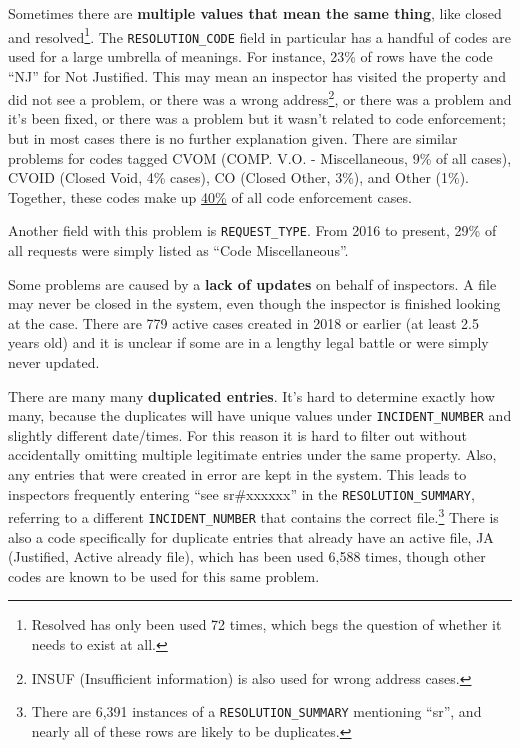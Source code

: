 \documentclass[
]{book}
\begin{document}
Sometimes there are \textbf{multiple values that mean the same thing}, like closed and resolved\footnote{Resolved has only been used 72 times, which begs the question of whether it needs to exist at all.}. The \texttt{RESOLUTION\_CODE} field in particular has a handful of codes are used for a large umbrella of meanings. For instance, 23\% of rows have the code ``NJ'' for Not Justified. This may mean an inspector has visited the property and did not see a problem, or there was a wrong address\footnote{INSUF (Insufficient information) is also used for wrong address cases.}, or there was a problem and it's been fixed, or there was a problem but it wasn't related to code enforcement; but in most cases there is no further explanation given. There are similar problems for codes tagged CVOM (COMP. V.O. - Miscellaneous, 9\% of all cases), CVOID (Closed Void, 4\% cases), CO (Closed Other, 3\%), and Other (1\%). Together, these codes make up \underline{40\%} of all code enforcement cases.

Another field with this problem is \texttt{REQUEST\_TYPE}. From 2016 to present, 29\% of all requests were simply listed as ``Code Miscellaneous''.

Some problems are caused by a \textbf{lack of updates} on behalf of inspectors. A file may never be closed in the system, even though the inspector is finished looking at the case. There are 779 active cases created in 2018 or earlier (at least 2.5 years old) and it is unclear if some are in a lengthy legal battle or were simply never updated.

There are many many \textbf{duplicated entries}. It's hard to determine exactly how many, because the duplicates will have unique values under \texttt{INCIDENT\_NUMBER} and slightly different date/times. For this reason it is hard to filter out without accidentally omitting multiple legitimate entries under the same property. Also, any entries that were created in error are kept in the system. This leads to inspectors frequently entering ``see sr\#xxxxxx'' in the \texttt{RESOLUTION\_SUMMARY}, referring to a different \texttt{INCIDENT\_NUMBER} that contains the correct file.\footnote{There are 6,391 instances of a \texttt{RESOLUTION\_SUMMARY} mentioning ``sr'', and nearly all of these rows are likely to be duplicates.} There is also a code specifically for duplicate entries that already have an active file, JA (Justified, Active already file), which has been used 6,588 times, though other codes are known to be used for this same problem.
\end{document}
